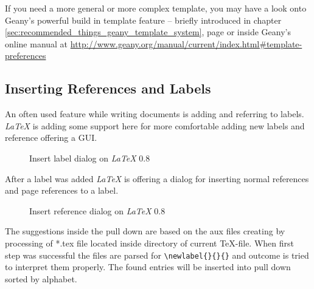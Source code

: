 \documentclass[%
paper=a4,%
fontsize=11pt,%
twoside=false,%
DIV18,%
headsepline,%
plainheadsepline,%
footsepline,%
plainfootsepline,%
bibliography=totoc,%
listof=totoc,%
BCOR10mm,%
parskip=half,%
openany,%
]{scrreprt}
\begin{document}
If you need a more general or more complex template, you may have a
look onto Geany's powerful build in template feature -- briefly
introduced in chapter \ref{sec:recommended_things_geany_template_system},
page \pageref{sec:recommended_things_geany_template_system} or inside
Geany's online manual at
\url{http://www.geany.org/manual/current/index.html#template-preferences}


\subsection{Inserting References and Labels}
An often used feature while writing documents is adding and referring
to labels. \textit{LaTeX} is adding some support here for more
comfortable adding new labels and reference offering a GUI.

\begin{figure}[h!]
    \caption{Insert label dialog on \textit{LaTeX} 0.8}
\end{figure}

After a label was added \textit{LaTeX} is offering a dialog for
inserting normal references and page references to a label.

\begin{figure}[h!]
    \caption{Insert reference dialog on \textit{LaTeX} 0.8}
\end{figure}

The suggestions inside the pull down are based on the aux files
creating by processing of *.tex file located inside directory of
current \TeX-file. When first step was successful the files are
parsed for \texttt{\textbackslash newlabel\{\}\{\}\{\}} and outcome
is tried to interpret them properly. The found entries will be
inserted into pull down sorted by alphabet.
\end{document}
